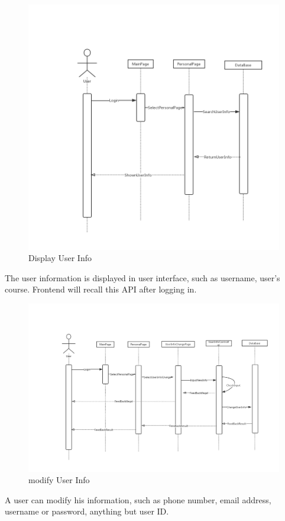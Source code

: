 \documentclass[16pt]{scrreprt}
\begin{document}
\begin{figure}[H]
    \includegraphics[width=\linewidth]{./FuncPhoto/3.png}   
    \caption{Display User Info}
\end{figure}
The user information is displayed in user interface, such as username, user's course. Frontend will recall this API after logging in.

\begin{figure}[H]
    \includegraphics[width=\linewidth]{./FuncPhoto/4.png}   
    \caption{modify User Info}
\end{figure}
A user can modify his information, such as phone number, email address, username or password, anything but user ID.
\end{document}
